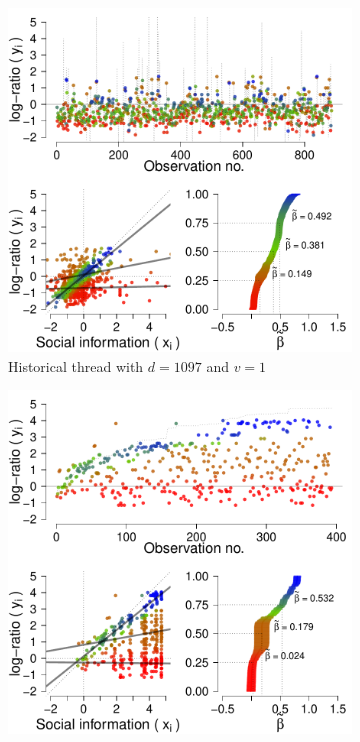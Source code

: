 \documentclass[9pt,twocolumn,twoside,lineno]{pnas-new}
\begin{document}
\begin{figure}[!ht]
	\centering
	\begin{subfigure}[t]{.44\linewidth}
		\centering
		\includegraphics[width=1\linewidth]{h10971.pdf}
		\caption{\footnotesize Historical thread with $d=1097$ and $v=1$}
		\label{fig: h d=1097, v=1}
	\end{subfigure}
	\begin{subfigure}[t]{.44\linewidth}
		\centering
		\includegraphics[width=1\linewidth]{m10979.pdf}

\end{subfigure}
\end{figure}
\end{document}
